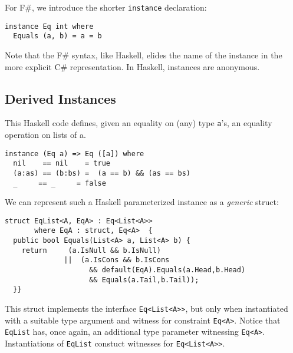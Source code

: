 \documentclass[preprint]{sig-alternate-05-2015}
\begin{document}
For F\#, we introduce the shorter \lstinline{instance} declaration:
\begin{lstlisting}
instance Eq int where 
  Equals (a, b) = a = b
\end{lstlisting}

Note that the F\# syntax, like Haskell, elides the name of the instance in the more explicit C\# representation.
In Haskell, instances are anonymous.


\subsection{Derived Instances}

This Haskell code defines, given an equality on (any) type \lstinline{a}'s, an equality operation on lists of a.
\begin{lstlisting}
instance (Eq a) => Eq ([a]) where 
  nil    == nil    = true
  (a:as) == (b:bs) =  (a == b) && (as == bs)
  _     == _     = false
\end{lstlisting}


We can represent such a Haskell parameterized instance as a \emph{generic} struct:


\begin{lstlisting}
struct EqList<A, EqA> : Eq<List<A>>
       where EqA : struct, Eq<A>  {
  public bool Equals(List<A> a, List<A> b) {
    return     (a.IsNull && b.IsNull)
              ||  (a.IsCons && b.IsCons 
                    && default(EqA).Equals(a.Head,b.Head) 
                    && Equals(a.Tail,b.Tail));
  }}
\end{lstlisting}

This struct implements the interface \lstinline{Eq<List<A>>}, but only when instantiated with a suitable type argument and witness for constraint \lstinline{Eq<A>}.
Notice that \lstinline{EqList} has, once again, an additional type parameter witnessing \lstinline{Eq<A>}.
Instantiations of \lstinline{EqList} constuct witnesses for \lstinline{Eq<List<A>>}.
\end{document}
